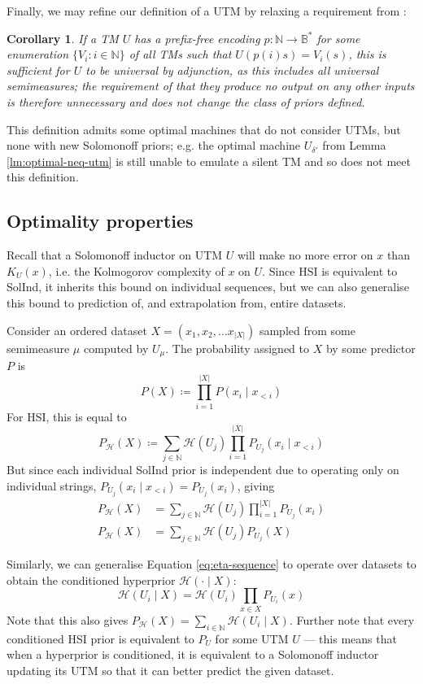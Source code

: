 \documentclass[11pt]{article}
\newcommand{\Eta}{\mathcal{H}}
\newtheorem{corollary}{Corollary}[theorem]
\begin{document}
Finally, we may refine our definition of a UTM by relaxing a requirement from \citet{Wood2013}:
\begin{corollary}
\label{cor:utm-codes}
If a TM $U$ has a prefix-free encoding $p:\mathbb{N}\to\mathbb{B}^*$ for some enumeration $\{V_i:i\in\mathbb{N}\}$ of all TMs such that $U(p(i)s)=V_i(s)$, this is sufficient for $U$ to be universal by adjunction, as this includes all universal semimeasures; the requirement of \citet{Wood2013} that they produce no output on any other inputs is therefore unnecessary and does not change the class of priors defined.
\end{corollary}
This definition admits some optimal machines that \citeauthor{Wood2013} do not consider UTMs, but none with new Solomonoff priors; e.g. the optimal machine $U_{\delta'}$ from Lemma \ref{lm:optimal-neq-utm} is still unable to emulate a silent TM and so does not meet this definition.


\subsection{Optimality properties}
\label{sec:optimality}
Recall that a Solomonoff inductor on UTM $U$ will make no more error on $x$ than $K_U(x)$, i.e. the Kolmogorov complexity of $x$ on $U$.
Since HSI is equivalent to SolInd, it inherits this bound on individual sequences, but we can also generalise this bound to prediction of, and extrapolation from, entire datasets.

Consider an ordered dataset $X=(x_1, x_2,\dots x_{|X|})$ sampled from some semimeasure $\mu$ computed by $U_\mu$.
The probability assigned to $X$ by some predictor $P$ is
\[
    P(X) \coloneq \prod_{i=1}^{|X|} P(x_i \mid x_{<i})
\]
For HSI, this is equal to
\[
    P_\Eta(X) \coloneq \sum_{j\in\mathbb{N}} \Eta(U_j) \prod_{i=1}^{|X|} P_{U_j}(x_i \mid x_{<i})
\]
But since each individual SolInd prior is independent due to operating only on individual strings, $P_{U_j}(x_i \mid x_{<i})=P_{U_j}(x_i)$, giving
\begin{align*}
    P_\Eta(X) &= \sum_{j\in\mathbb{N}} \Eta(U_j) \prod_{i=1}^{|X|} P_{U_j}(x_i)\\
    P_\Eta(X) &= \sum_{j\in\mathbb{N}} \Eta(U_j) P_{U_j}(X)
\end{align*}

Similarly, we can generalise Equation \ref{eq:eta-sequence} to operate over datasets to obtain the conditioned hyperprior $\Eta(\cdot \mid X)$:
\begin{equation}
\label{eq:eta-dataset}
    \Eta(U_i \mid X) = \Eta(U_i) \prod_{x \in X} P_{U_i}(x)
\end{equation}
Note that this also gives $P_\Eta(X) = \sum_{i\in\mathbb{N}}\Eta(U_i \mid X)$.
Further note that every conditioned HSI prior is equivalent to $P_U$ for some UTM $U$ --- this means that when a hyperprior is conditioned, it is equivalent to a Solomonoff inductor updating its UTM so that it can better predict the given dataset.
\end{document}
